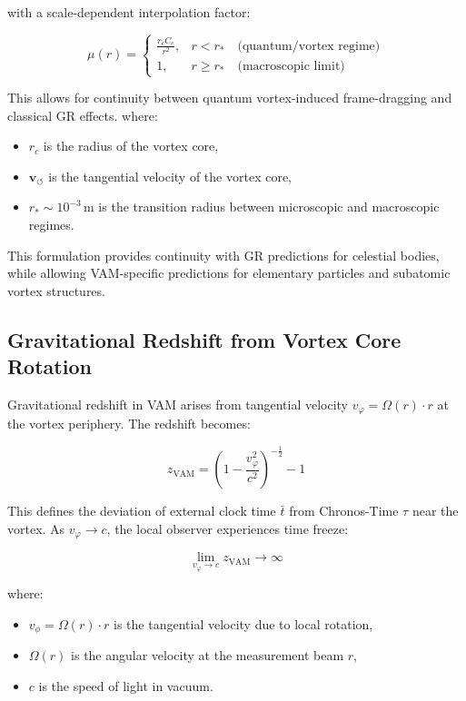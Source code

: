 \noindent with a scale-dependent interpolation factor:

\begin{equation}
    \mu(r) =
    \begin{cases}
        \frac{r_c C_e}{r^2}, & r < r_\ast \quad \text{(quantum/vortex regime)} \\
        1, & r \geq r_\ast \quad \text{(macroscopic limit)}
    \end{cases}
\end{equation}

This allows for continuity between quantum vortex-induced frame-dragging and classical GR effects.
where:
\begin{itemize}
    \item \( r_c \) is the radius of the vortex core,
    \item \( \mathbf{v}_{\scriptscriptstyle\boldsymbol{\circlearrowleft}} \) is the tangential velocity of the vortex core,
    \item \( r_\ast \sim 10^{-3} \, \text{m} \) is the transition radius between microscopic and macroscopic regimes.
\end{itemize}

This formulation provides continuity with GR predictions for celestial bodies, while allowing VAM-specific predictions for elementary particles and subatomic vortex structures.

\subsection*{Gravitational Redshift from Vortex Core Rotation}

Gravitational redshift in VAM arises from tangential velocity \( v_\varphi = \Omega(r) \cdot r \) at the vortex periphery. The redshift becomes:

\begin{equation}
    z_\text{VAM} = \left( 1 - \frac{v_\varphi^2}{c^2} \right)^{-\frac{1}{2}} - 1
\end{equation}

This defines the deviation of external clock time \( \bar{t} \) from Chronos-Time \( \tau \) near the vortex. As \( v_\varphi \to c \), the local observer experiences time freeze:

\[
    \lim_{v_\varphi \to c} z_\text{VAM} \to \infty
\]

where:
\begin{itemize}
    \item \( v_\phi = \Omega(r) \cdot r \) is the tangential velocity due to local rotation,
    \item \( \Omega(r) \) is the angular velocity at the measurement beam \( r \),
    \item \( c \) is the speed of light in vacuum.

\end{itemize}

